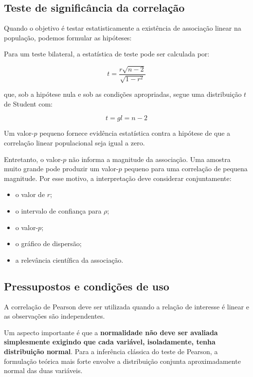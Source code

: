 \subsection{Teste de significância da correlação}

Quando o objetivo é testar estatisticamente a existência de associação linear
na população, podemos formular as hipóteses:


Para um teste bilateral, a estatística de teste pode ser calculada por:


\begin{equation}
  t=
\frac{
r\sqrt{n-2}
}{
\sqrt{1-r^2}
}
\end{equation}


que, sob a hipótese nula e sob as condições apropriadas, segue uma
distribuição $t$ de Student com:


\begin{equation}
  t= gl=n-2
\end{equation}

Um valor-$p$ pequeno fornece evidência estatística contra a hipótese de que
a correlação linear populacional seja igual a zero.

Entretanto, o valor-$p$ não informa a magnitude da associação. Uma amostra
muito grande pode produzir um valor-$p$ pequeno para uma correlação de pequena
magnitude. Por esse motivo, a interpretação deve considerar conjuntamente:

\begin{itemize}
    \item o valor de $r$;
    \item o intervalo de confiança para $\rho$;
    \item o valor-$p$;
    \item o gráfico de dispersão;
    \item a relevância científica da associação.
\end{itemize}

\subsection{Pressupostos e condições de uso}

A correlação de Pearson deve ser utilizada quando a relação de interesse é
linear e as observações são independentes.

Um aspecto importante é que a \textbf{normalidade não deve ser avaliada
simplesmente exigindo que cada variável, isoladamente, tenha distribuição
normal}. Para a inferência clássica do teste de Pearson, a formulação teórica
mais forte envolve a distribuição conjunta aproximadamente normal das duas
variáveis.

